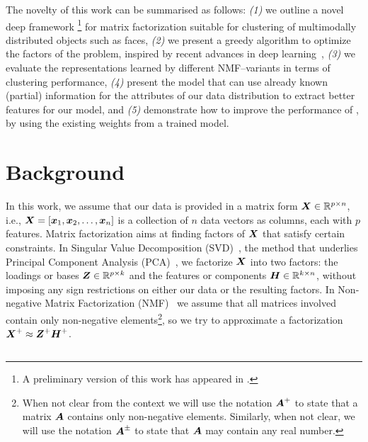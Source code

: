 \documentclass[10pt,journal,compsoc]{IEEEtran}
\begin{document}
The novelty of this work can be summarised as follows: \emph{(1)} we outline a novel deep framework \footnote{A preliminary version of this work has appeared in \citet{Trigeorgis2014}.} for matrix factorization suitable for clustering of multimodally distributed objects such as faces, \emph{(2)} we present a greedy  algorithm to optimize the factors of the \seminmf problem, inspired by recent advances in deep learning~\cite{hinton2006reducing},
\emph{(3)} we evaluate the representations learned by different NMF--variants in terms of clustering performance, \emph{(4)} present the \dwsf{} model that can use already known (partial) information for the attributes of our data distribution to extract better features for our model, and \emph{(5)} demonstrate how to improve the performance of \deepseminmf, by using the existing weights from a trained \dwsf{} model.

\section{Background} \label{sec:related}
\def\algorithmautorefname{Algorithm}
In this work, we assume that our data is provided in a matrix form ${\boldsymbol X}\in \mathbb{R}^{p\times n}$, 
i.e., ${\boldsymbol{X}}=[{\boldsymbol{x}_1}, {\boldsymbol{x}_2}, \ldots, {\boldsymbol{x}_n}]$ is a collection of $n$ data vectors as columns, each with $p$ features. Matrix factorization aims at finding factors of ${\boldsymbol{X}}$ that satisfy certain constraints. In Singular Value Decomposition (SVD)~\cite{golub1970singular}, the method that underlies Principal Component Analysis (PCA)~\cite{wold1987principal}, we factorize ${\boldsymbol X}$ into two factors: the loadings or bases $\boldsymbol Z \in \mathbb{R}^{p\times k}$ and the features or components $\boldsymbol H \in {\mathbb{R}}^{k\times n}$, without imposing any sign restrictions on either our data or the resulting factors. In Non-negative Matrix Factorization (NMF)~\cite{seung2001algorithms} we assume that all matrices involved contain only non-negative elements\footnote{When not clear from the context we will use the notation $\boldsymbol{A}^+$ to state that a matrix ${\boldsymbol{A}}$ contains only non-negative elements. Similarly, when not clear, we will use the notation $\boldsymbol{A}^\pm$ to state that ${\boldsymbol{A}}$ may contain any real number.}, so we try to approximate a factorization ${\boldsymbol{X}^+} \approx {\boldsymbol Z^+ \boldsymbol H^+}$.
\subsection{\seminmf}

\end{document}
